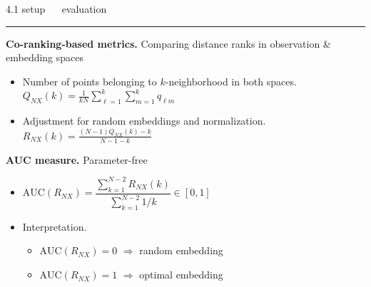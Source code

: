 \documentclass[11pt, compress, t, notes = noshow, xcolor = table, 
aspectratio = 1610]{beamer}
\newcommand{\highlight}[1]{\textcolor{highlightcol}{\textbf{#1}}}
\newcommand{\arritem}{\item[\highlight{$\rightarrow$}]}
\newcommand{\flexitem}[1]{\item[$\highlight{#1}$]}
\begin{document}
\LARGE
\begin{frame}{\textcolor{gray!90}{4.1 setup} ~~ evaluation}
\normalsize
\vspace{-0.5cm}
\noindent \textcolor{gray!90}{\rule{\textwidth}{1pt}}
\smallskip

\textbf{Co-ranking-based metrics.} Comparing distance ranks in observation \& 
embedding spaces

\begin{itemize}
  \arritem Number of points belonging to $k$-neighborhood in both spaces. 
  $Q_{NX}(k) = \frac{1}{kN} \sum_{\ell = 1}^k \sum_{m = 1}^k 
  q_{\ell m}$
  \arritem Adjustment for random embeddings and normalization. \\ 
  $R_{NX}(k) = \frac{(N - 1) Q_{NX}(k) - k}{N - 1 - k}$
\end{itemize}

\vspace{0.3cm}

\textbf{AUC measure.} Parameter-free

\begin{itemize}
  \arritem $\text{AUC}(R_{NX}) = \dfrac{\sum_{k = 1}^{N - 2} R_{NX}(k)}{
  \sum_{k = 1}^{N - 2} 1 / k} \in [0, 1]$
  \arritem Interpretation.
  \begin{itemize}
    \flexitem{1} $\text{AUC}(R_{NX}) = 0$ $\Rightarrow$ random embedding
    \flexitem{2} $\text{AUC}(R_{NX}) = 1$ $\Rightarrow$ optimal embedding
  \end{itemize}
\end{itemize}

\end{frame}

\end{document}
